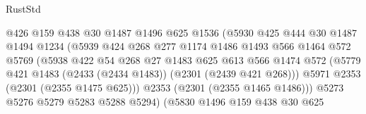 \begin{lexlean}{RustStd}
\begin{coremodule}
{\begin{coremodule}
{{{{{{{{{{{{{                                  @426
                                  @159
                                  @438
                                  @30
                                  @1487
                                  @1496
                                  @625
                                  @1536
                                  (@5930
                                    @425
                                    @444
                                    @30
                                    @1487
                                    @1494
                                    @1234
                                    (@5939
                                      @424
                                      @268
                                      @277
                                      @1174
                                      @1486
                                      @1493
                                      @566
                                      @1464
                                      @572
                                      @5769
                                      (@5938
                                        @422
                                        @54
                                        @268
                                        @27
                                        @1483
                                        @625
                                        @613
                                        @566
                                        @1474
                                        @572
                                        (@5779
                                          @421
                                          @1483
                                          (@2433 (@2434 @1483))
                                          (@2301 (@2439 @421 @268)))
                                        @5971
                                        @2353
                                        (@2301 (@2355 @1475 @625)))
                                      @2353
                                      (@2301 (@2355 @1465 @1486)))
                                    @5273
                                    @5276
                                    @5279
                                    @5283
                                    @5288
                                    @5294)
                                  (@5830
                                    @1496
                                    @159
                                    @438
                                    @30
                                    @625
}}}}}}}}}}}}}
\end{coremodule}}
\end{coremodule}
\end{lexlean}
